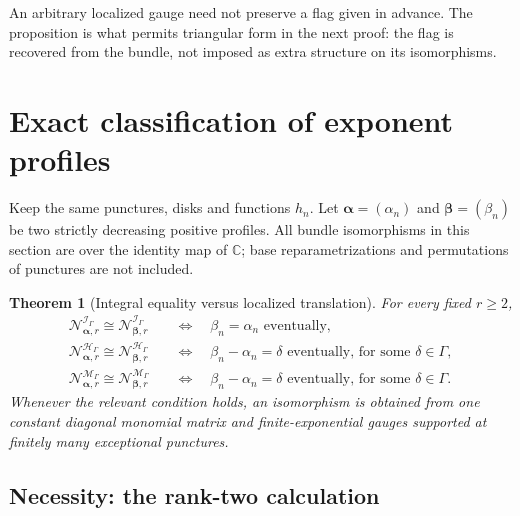 \documentclass[11pt,letterpaper]{article}
\newtheorem{theorem}{Theorem}[section]
\theoremstyle{definition}
\theoremstyle{remark}
\newcommand{\C}{\mathbb C}
\newcommand{\HH}{\mathscr H_\Gamma}
\newcommand{\II}{\mathscr I_\Gamma}
\newcommand{\MM}{\mathscr M_\Gamma}
\newcommand{\profile}{\boldsymbol\alpha}
\newcommand{\betaprofile}{\boldsymbol\beta}
\newcommand{\NN}[1]{\mathcal N_{\profile,#1}}
\newcommand{\NNb}[1]{\mathcal N_{\betaprofile,#1}}
\numberwithin{equation}{section}
\begin{document}
An arbitrary localized gauge need not preserve a flag given in advance. The
proposition is what permits triangular form in the next proof: the flag is
recovered from the bundle, not imposed as extra structure on its isomorphisms.

\section{Exact classification of exponent profiles}
\label{nab:loc:sec:classification}

Keep the same punctures, disks and functions $h_n$. Let $\profile=(\alpha_n)$
and $\betaprofile=(\beta_n)$ be two strictly decreasing positive profiles. All
bundle isomorphisms in this section are over the identity map of $\C$; base
reparametrizations and permutations of punctures are not included.

\begin{theorem}[Integral equality versus localized translation]
\label{nab:loc:thm:classification}
For every fixed $r\geq2$,
\begin{align}
 \NN r^{\II}\cong\NNb r^{\II}
 &\quad\Longleftrightarrow\quad
 \beta_n=\alpha_n\text{ eventually},\label{nab:loc:eq:integral-class}\\
 \NN r^{\HH}\cong\NNb r^{\HH}
 &\quad\Longleftrightarrow\quad
 \beta_n-\alpha_n=\delta\text{ eventually, for some }\delta\in\Gamma,
 \label{nab:loc:eq:full-class}\\
 \NN r^{\MM}\cong\NNb r^{\MM}
 &\quad\Longleftrightarrow\quad
 \beta_n-\alpha_n=\delta\text{ eventually, for some }\delta\in\Gamma.
 \label{nab:loc:eq:mer-class}
\end{align}
Whenever the relevant condition holds, an isomorphism is obtained from one
constant diagonal monomial matrix and finite-exponential gauges supported at
finitely many exceptional punctures.
\end{theorem}

\subsection{Necessity: the rank-two calculation}
\end{document}
